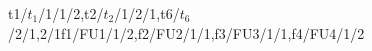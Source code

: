\begin{specialprocessor}{2}{2}{t1/$t_1$/1/{1}/2,t2/$t_2$/1/{2}/1,t6/$t_6$/2/{1,2}/1}{f1/FU1/1/{2},f2/FU2/1/{1},f3/FU3/1/{1},f4/FU4/1/{2}}
\end{specialprocessor}